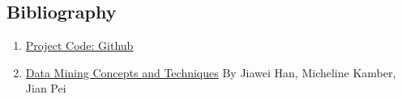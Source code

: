 \documentclass{article}
\begin{document}
\begin{justify}
\subsection{Bibliography}\label{bibliography}

\begin{enumerate}
    \item \href{https://github.com/Anjali19991/Mushroom-Classification}{Project Code: Github}
    \item \href{https://hanj.cs.illinois.edu/bk3/bk3_slidesindex.htm}{Data Mining Concepts and Techniques} By Jiawei Han, Micheline Kamber, Jian Pei
\end{enumerate}

\end{justify}
\end{document}
